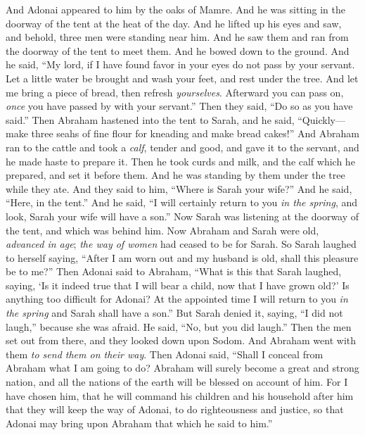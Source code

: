 \begin{biblechapter} %
 And Adonai appeared to him by the oaks of Mamre. And he was sitting in the doorway of the tent at the heat of the day.
\verse And he lifted up his eyes and saw, and behold, three men were standing near him. And he saw them and ran from the doorway of the tent to meet them. And he bowed down to the ground.
\verse And he said, “My lord, if I have found favor in your eyes do not pass by your servant.
\verse Let a little water be brought and wash your feet, and rest under the tree.
\verse And let me bring a piece of bread, then refresh \textit{yourselves}. Afterward you can pass on, \textit{once} you have passed by with your servant.” Then they said, “Do so as you have said.”
\verse Then Abraham hastened into the tent to Sarah, and he said, “Quickly—make three seahs of fine flour for kneading and make bread cakes!”
\verse And Abraham ran to the cattle and took a \textit{calf}, tender and good, and gave it to the servant, and he made haste to prepare it.
\verse Then he took curds and milk, and the calf which he prepared, and set it before them. And he was standing by them under the tree while they ate.
\verse And they said to him, “Where is Sarah your wife?” And he said, “Here, in the tent.”
\verse And he said, “I will certainly return to you \textit{in the spring}, and look, Sarah your wife will have a son.” Now Sarah was listening at the doorway of the tent, and which was behind him.
\verse Now Abraham and Sarah were old, \textit{advanced in age}; \textit{the way of women} had ceased to be for Sarah.
\verse So Sarah laughed to herself saying, “After I am worn out and my husband is old, shall this pleasure be to me?”
\verse Then Adonai said to Abraham, “What is this that Sarah laughed, saying, ‘Is it indeed true that I will bear a child, now that I have grown old?’
\verse Is anything too difficult for Adonai? At the appointed time I will return to you \textit{in the spring} and Sarah shall have a son.”
\verse But Sarah denied it, saying, “I did not laugh,” because she was afraid. He said, “No, but you did laugh.”
\verse Then the men set out from there, and they looked down upon Sodom. And Abraham went with them \textit{to send them on their way}.
\verse Then Adonai said, “Shall I conceal from Abraham what I am going to do?
\verse Abraham will surely become a great and strong nation, and all the nations of the earth will be blessed on account of him.
\verse For I have chosen him, that he will command his children and his household after him that they will keep the way of Adonai, to do righteousness and justice, so that Adonai may bring upon Abraham that which he said to him.”

\end{biblechapter}

